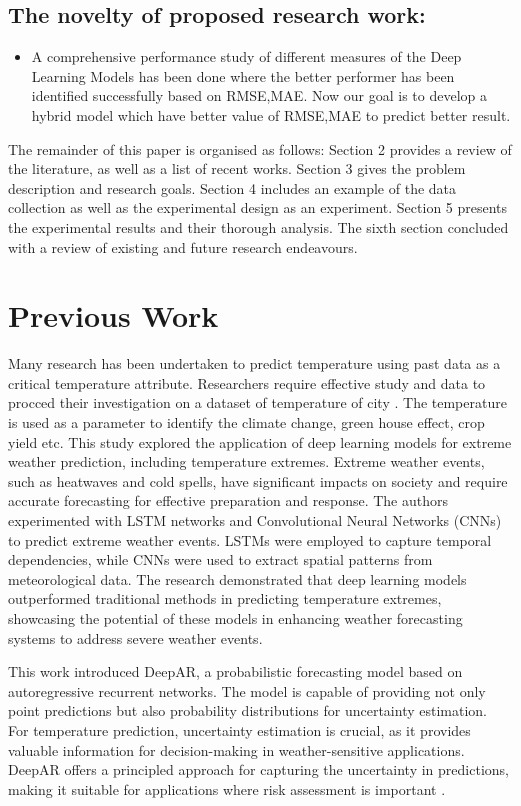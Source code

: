 \documentclass[sn-mathphys,Numbered]{sn-jnl}
\theoremstyle{thmstyleone}
\theoremstyle{thmstyletwo}
\theoremstyle{thmstylethree}
\begin{document}
\subsection{The novelty of proposed research work:}

\begin{itemize}
\item A comprehensive performance study of different measures of the Deep Learning Models has been done where the better performer has been identified successfully based on RMSE,MAE. Now our goal is to develop a hybrid model which have better value of RMSE,MAE to predict better result.
\end{itemize}
The remainder of this paper is organised as follows: Section 2 provides a review of the literature, as well as a list of recent works. Section 3 gives the problem description and research goals. Section 4 includes an example of the data collection as well as the experimental design as an experiment. Section 5 presents the experimental results and their thorough analysis. The sixth section concluded with a review of existing and future research endeavours.

\section{Previous Work}
Many research has been undertaken to predict temperature using past data as a critical temperature attribute. Researchers require effective study and data to procced their investigation on a dataset of temperature of city \cite{cifuentes2020air}. The temperature is used as a parameter to identify the climate change,  green house effect, crop yield etc.
\cite{2019AGUFMGC33A..05P}This study explored the application of deep learning models for extreme weather prediction, including temperature extremes. Extreme weather events, such as heatwaves and cold spells, have significant impacts on society and require accurate forecasting for effective preparation and response. The authors experimented with LSTM networks and Convolutional Neural Networks (CNNs) to predict extreme weather events. LSTMs were employed to capture temporal dependencies, while CNNs were used to extract spatial patterns from meteorological data. The research demonstrated that deep learning models outperformed traditional methods in predicting temperature extremes, showcasing the potential of these models in enhancing weather forecasting systems to address severe weather events.

This work introduced DeepAR, a probabilistic forecasting model based on autoregressive recurrent networks. The model is capable of providing not only point predictions but also probability distributions for uncertainty estimation. For temperature prediction, uncertainty estimation is crucial, as it provides valuable information for decision-making in weather-sensitive applications. DeepAR offers a principled approach for capturing the uncertainty in predictions, making it suitable for applications where risk assessment is important \cite{salinas2020deepar}.
\end{document}

